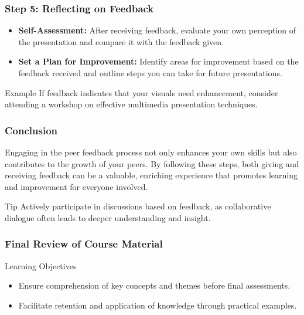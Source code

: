 \documentclass[aspectratio=169]{beamer}
\begin{document}
\begin{frame}[fragile]
    \frametitle{Step 5: Reflecting on Feedback}
    \begin{itemize}
        \item \textbf{Self-Assessment:} After receiving feedback, evaluate your own perception of the presentation and compare it with the feedback given.
        \item \textbf{Set a Plan for Improvement:} Identify areas for improvement based on the feedback received and outline steps you can take for future presentations.
    \end{itemize}

    \begin{block}{Example}
        If feedback indicates that your visuals need enhancement, consider attending a workshop on effective multimedia presentation techniques.
    \end{block}
\end{frame}

\begin{frame}[fragile]
    \frametitle{Conclusion}
    Engaging in the peer feedback process not only enhances your own skills but also contributes to the growth of your peers. By following these steps, both giving and receiving feedback can be a valuable, enriching experience that promotes learning and improvement for everyone involved.

    \begin{block}{Tip}
        Actively participate in discussions based on feedback, as collaborative dialogue often leads to deeper understanding and insight.
    \end{block}
\end{frame}

\begin{frame}[fragile]
    \frametitle{Final Review of Course Material}
    \begin{block}{Learning Objectives}
        \begin{itemize}
            \item Ensure comprehension of key concepts and themes before final assessments.
            \item Facilitate retention and application of knowledge through practical examples.
        \end{itemize}
    \end{block}
\end{frame}
\end{document}
